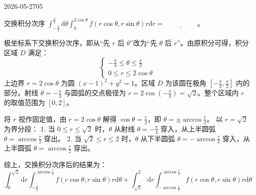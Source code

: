 \begin{mistake}{2026-05-27}{05}

\begin{problemcontent}
交换积分次序 \(\int_{-\frac{\pi}{4}}^{\frac{\pi}{2}} \mathrm{d}\theta \int_{0}^{2\cos\theta} f(r\cos\theta, r\sin\theta) r \mathrm{d}r = \underline{\hspace{2cm}}\)。
\end{problemcontent}

\begin{solutioncontent}
极坐标系下交换积分次序，即从“先 \(r\) 后 \(\theta\)”改为“先 \(\theta\) 后 \(r\)”。由原积分可得，积分区域 \(D\) 满足：
\[
\begin{cases}
-\frac{\pi}{4} \le \theta \le \frac{\pi}{2} \\
0 \le r \le 2\cos\theta
\end{cases}
\]
上边界 \(r = 2\cos\theta\) 为圆 \((x-1)^2 + y^2 = 1\)。区域 \(D\) 为该圆在极角 \([-\frac{\pi}{4}, \frac{\pi}{2}]\) 内的部分。射线 \(\theta = -\frac{\pi}{4}\) 与圆弧的交点极径为 \(r = 2\cos\left(-\frac{\pi}{4}\right) = \sqrt{2}\)。整个区域内 \(r\) 的取值范围为 \([0, 2]\)。

将 \(r\) 视作固定值，由 \(r = 2\cos\theta\) 解得 \(\cos\theta = \frac{r}{2}\)，即 \(\theta = \pm \arccos\frac{r}{2}\)。
以 \(r = \sqrt{2}\) 为界分段：
1. 当 \(0 \le r \le \sqrt{2}\) 时，\(\theta\) 从射线 \(\theta = -\frac{\pi}{4}\) 穿入，从上半圆弧 \(\theta = \arccos\frac{r}{2}\) 穿出。
2. 当 \(\sqrt{2} \le r \le 2\) 时，\(\theta\) 从下半圆弧 \(\theta = -\arccos\frac{r}{2}\) 穿入，从上半圆弧 \(\theta = \arccos\frac{r}{2}\) 穿出。

综上，交换积分次序后的结果为：
\[
\int_{0}^{\sqrt{2}} \mathrm{d}r \int_{-\frac{\pi}{4}}^{\arccos\frac{r}{2}} f(r\cos\theta, r\sin\theta) r \mathrm{d}\theta + \int_{\sqrt{2}}^{2} \mathrm{d}r \int_{-\arccos\frac{r}{2}}^{\arccos\frac{r}{2}} f(r\cos\theta, r\sin\theta) r \mathrm{d}\theta
\]
\end{solutioncontent}


\end{mistake}
